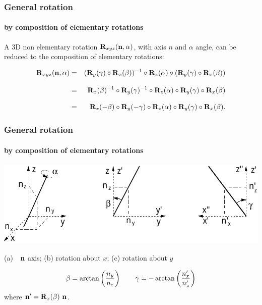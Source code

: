 \documentclass{beamer}
\begin{document}
\begin{frame}
\frametitle{General rotation}
\framesubtitle{by composition of elementary rotations}\small

A 3D non elementary rotation ${\bf R}_{xyz}({\bf n}, \alpha)$, with axis $n$ and $\alpha$ angle, can be reduced to the composition of elementary rotations:

\vfill

\begin{eqnarray*}
\T{R}_{xyz}(\v{n}, \alpha)
&=&
(\T{R}_y(\gamma)\circ \T{R}_x(\beta))^{-1}\circ
\T{R}_z(\alpha)\circ
(\T{R}_y(\gamma)\circ \T{R}_x(\beta)) \\[0.3cm] \hfill
&=&
\T{R}_x(\beta)^{-1}\circ \T{R}_y(\gamma)^{-1}\circ
\T{R}_z(\alpha)\circ
\T{R}_y(\gamma)\circ \T{R}_x(\beta) \\[0.3cm] \hfill
&=&
\T{R}_x(-\beta)\circ \T{R}_y(-\gamma)\circ
\T{R}_z(\alpha)\circ
\T{R}_y(\gamma)\circ \T{R}_x(\beta) .
\end{eqnarray*}


\end{frame}
\begin{frame}
\frametitle{General rotation}
\framesubtitle{by composition of elementary rotations}\small

\vfill
\begin{center}
\includegraphics[width=\linewidth]{figs/rotelem}

(a)~~${\bf n}$ axis; (b) rotation about $x$; (c) rotation about $y$
\end{center}
\vfill
\[
\beta = \arctan\left({n_y\over n_z}\right)
\qquad
\gamma = -\arctan\left({n'_x\over n'_z}\right)
\]
where ${\bf n}' = {\bf R}_x(\beta)\  {\bf n}$.


\end{frame}
\end{document}
